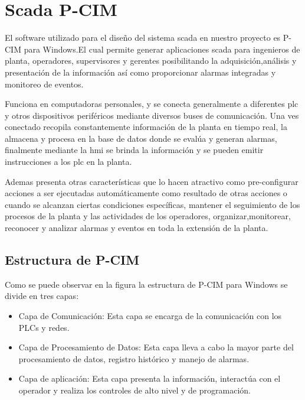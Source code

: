 \section{Scada P-CIM}
\label{sec:ScadaPCIM} 
El software utilizado para el diseño del sistema \gls{scada} en nuestro proyecto es P-CIM 
para Windows.El cual permite generar aplicaciones \gls{scada} para ingenieros de planta, 
operadores, supervisores y gerentes posibilitando la adquisición,análisis y presentación 
de la información así como proporcionar alarmas integradas y monitoreo de eventos.

Funciona en computadoras personales, y se conecta generalmente a diferentes \gls{plc} 
y otros dispositivos periféricos mediante diversos buses de comunicación.
Una ves conectado recopila constantemente información de la planta en tiempo
real, la almacena y procesa en la base de datos donde se evalúa y generan alarmas, 
finalmente mediante la \gls{hmi} se brinda la información y se pueden emitir
instrucciones a los \gls{plc} en la planta. 

Ademas presenta otras características que lo hacen atractivo como pre-configurar acciones 
a ser ejecutadas automáticamente como resultado de otras acciones o cuando se alcanzan ciertas 
condiciones específicas, mantener el seguimiento de los procesos de la planta y las actividades 
de los operadores, organizar,monitorear, reconocer y analizar alarmas y eventos en toda la extensión 
de la planta.



\subsection{Estructura de P-CIM}
\label{sec:CapasPrograma}
Como se puede observar en la figura la estructura de P-CIM 
para Windows se divide en tres capas:
\begin{itemize}
 \item Capa de Comunicación: Esta capa se encarga de la comunicación con los PLCs y redes.
 \item Capa de Procesamiento de Datos: Esta capa lleva a cabo la mayor parte del procesamiento 
 de datos, registro histórico y manejo de alarmas.
 \item Capa de aplicación: Esta capa presenta la información, interactúa con el operador y 
 realiza los controles de alto nivel y de programación.
\end{itemize}

